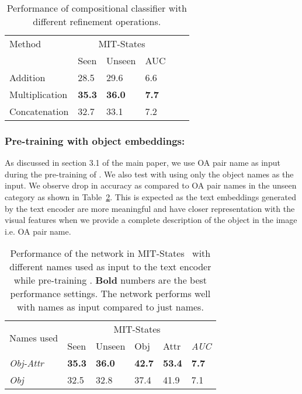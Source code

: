 \documentclass{bmvc2k}
\newcommand{\tablelightgray}{\rowcolor[gray]{.95}}
\begin{document}
\begin{table}[h]
\centering
\begin{tabular}{l|lllll}

Method         & \multicolumn{3}{c}{MIT-States}~\cite{isola2015discovering}             \\ 
               & Seen          & Unseen        & AUC          \\ \hline
\tablelightgray
Addition       & 28.5          & 29.6          & 6.6          \\
Multiplication & \textbf{35.3} & \textbf{36.0} & \textbf{7.7} \\
\tablelightgray
Concatenation  & 32.7             & 33.1             & 7.2            \\ \hline
\end{tabular}
 \caption{Performance of compositional classifier with different refinement operations. }
\label{tab:abl:refinement}
\end{table}

\subsubsection{Pre-training  with object embeddings:} As discussed in section 3.1 of the main paper, we use OA pair name  as input during the pre-training of . We also test with using only the object names  as the input. We observe  drop in accuracy as compared to OA pair names in the unseen category as shown in Table~\ref{tab:obj}. This is expected as the text embeddings generated by the text encoder are more meaningful and have closer representation with the visual features when we provide a complete description of the object in the image i.e. OA pair name.

\begin{table}[h]
\centering
\begin{tabular}{l|lllll}
\multirow{2}{*}{Names used}      & \multicolumn{5}{c}{MIT-States~\cite{isola2015discovering}}                                                                            \\
                                 & \multicolumn{1}{l|}{Seen} & \multicolumn{1}{l|}{Unseen} & \multicolumn{1}{l|}{Obj}  & \multicolumn{1}{l|}{Attr} & \textit{AUC} \\ \hline
\tablelightgray\textit{Obj-Attr} & \multicolumn{1}{l|}{\textbf{35.3}} & \multicolumn{1}{l|}{\textbf{36.0}}   & \multicolumn{1}{l|}{\textbf{42.7}} & \multicolumn{1}{l|}{\textbf{53.4}} & \textbf{7.7} \\
\textit{Obj}                     & \multicolumn{1}{l|}{32.5} & \multicolumn{1}{l|}{32.8}   & \multicolumn{1}{l|}{37.4} & \multicolumn{1}{l|}{41.9} & 7.1         
\end{tabular}
\vspace{0.1cm}
\caption{Performance of the network in MIT-States~\cite{isola2015discovering} with different names used as input to the text encoder while pre-training . \textbf{Bold} numbers are the best performance settings. The network performs well with  names as input compared to just  names.} 
\label{tab:obj}
\vspace{-0.4cm}
\end{table}
\end{document}
